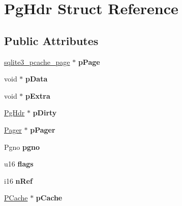 \hypertarget{struct_pg_hdr}{\section{Pg\-Hdr Struct Reference}
\label{struct_pg_hdr}
}
\subsection*{Public Attributes}
\begin{DoxyCompactItemize}
\item 
\hypertarget{struct_pg_hdr_aa5645976ba0634993a7304dce8856c8b}{\hyperlink{structsqlite3__pcache__page}{sqlite3\-\_\-pcache\-\_\-page} $\ast$ {\bfseries p\-Page}}\label{struct_pg_hdr_aa5645976ba0634993a7304dce8856c8b}

\item 
\hypertarget{struct_pg_hdr_a0f9f2ac8492c0cdad5898036db20b798}{void $\ast$ {\bfseries p\-Data}}\label{struct_pg_hdr_a0f9f2ac8492c0cdad5898036db20b798}

\item 
\hypertarget{struct_pg_hdr_a8ff7430ed04077f1ae20d10801968164}{void $\ast$ {\bfseries p\-Extra}}\label{struct_pg_hdr_a8ff7430ed04077f1ae20d10801968164}

\item 
\hypertarget{struct_pg_hdr_a7732b1c0f19d9555ac93d4879fc95bbd}{\hyperlink{struct_pg_hdr}{Pg\-Hdr} $\ast$ {\bfseries p\-Dirty}}\label{struct_pg_hdr_a7732b1c0f19d9555ac93d4879fc95bbd}

\item 
\hypertarget{struct_pg_hdr_aaa4879a9510c8a819a1e10a8ee21495b}{\hyperlink{struct_pager}{Pager} $\ast$ {\bfseries p\-Pager}}\label{struct_pg_hdr_aaa4879a9510c8a819a1e10a8ee21495b}

\item 
\hypertarget{struct_pg_hdr_ab6e2223e410acf9bae7f12f1b1293589}{Pgno {\bfseries pgno}}\label{struct_pg_hdr_ab6e2223e410acf9bae7f12f1b1293589}

\item 
\hypertarget{struct_pg_hdr_a8ef58380f7e04f1e3c76fa208e227f95}{u16 {\bfseries flags}}\label{struct_pg_hdr_a8ef58380f7e04f1e3c76fa208e227f95}

\item 
\hypertarget{struct_pg_hdr_ac68c685d117788c18849e8853dd419d5}{i16 {\bfseries n\-Ref}}\label{struct_pg_hdr_ac68c685d117788c18849e8853dd419d5}

\item 
\hypertarget{struct_pg_hdr_a557aeaddd1b0805815ce06f1bfd27782}{\hyperlink{struct_p_cache}{P\-Cache} $\ast$ {\bfseries p\-Cache}}\label{struct_pg_hdr_a557aeaddd1b0805815ce06f1bfd27782}


\end{DoxyCompactItemize}
